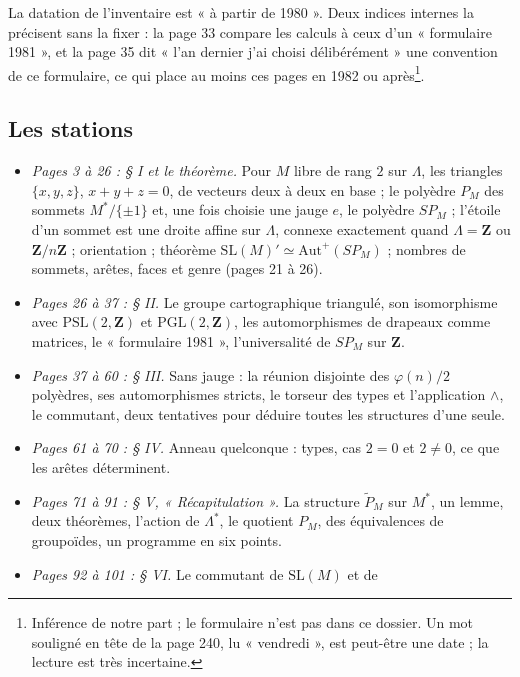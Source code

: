 \documentclass[11pt,a4paper]{article}
\begin{document}
La datation de l'inventaire est « à partir de 1980 ». Deux indices internes
la précisent sans la fixer : la page 33 compare les calculs à ceux d'un
« formulaire 1981 », et la page 35 dit « l'an dernier j'ai choisi
délibérément » une convention de ce formulaire, ce qui place au moins ces
pages en 1982 ou après\footnote{Inférence de notre part ; le formulaire n'est
pas dans ce dossier. Un mot souligné en tête de la page 240, lu
« vendredi », est peut-être une date ; la lecture est très incertaine.}.

\subsection*{Les stations}

\begin{itemize}
  \item \emph{Pages 3 à 26 : § I et le théorème.} Pour $M$ libre de rang $2$
    sur $\Lambda$, les triangles $\{x, y, z\}$, $x + y + z = 0$, de vecteurs
    deux à deux en base ; le polyèdre $P_M$ des sommets $M^{*}/\{\pm 1\}$ et,
    une fois choisie une jauge $e$, le polyèdre $SP_M$ ; l'étoile d'un sommet
    est une droite affine sur $\Lambda$, connexe exactement quand $\Lambda =
    \mathbf{Z}$ ou $\mathbf{Z}/n\mathbf{Z}$ ; orientation ; théorème
    $\mathrm{SL}(M)' \simeq \mathrm{Aut}^{+}(SP_M)$ ; nombres de sommets,
    arêtes, faces et genre (pages 21 à 26).
  \item \emph{Pages 26 à 37 : § II.} Le groupe cartographique triangulé, son
    isomorphisme avec $\mathrm{PSL}(2, \mathbf{Z})$ et $\mathrm{PGL}(2,
    \mathbf{Z})$, les automorphismes de drapeaux comme matrices, le
    « formulaire 1981 », l'universalité de $SP_M$ sur $\mathbf{Z}$.
  \item \emph{Pages 37 à 60 : § III.} Sans jauge : la réunion disjointe des
    $\varphi(n)/2$ polyèdres, ses automorphismes stricts, le torseur des types
    et l'application $\wedge$, le commutant, deux tentatives pour déduire
    toutes les structures d'une seule.
  \item \emph{Pages 61 à 70 : § IV.} Anneau quelconque : types, cas $2 = 0$
    et $2 \neq 0$, ce que les arêtes déterminent.
  \item \emph{Pages 71 à 91 : § V, « Récapitulation ».} La structure
    $\widetilde{P}_M$ sur $M^{*}$, un lemme, deux théorèmes, l'action de
    $\Lambda^{*}$, le quotient $P_M$, des équivalences de groupoïdes, un
    programme en six points.
  \item \emph{Pages 92 à 101 : § VI.} Le commutant de $\mathrm{SL}(M)$ et de

\end{itemize}
\end{document}
